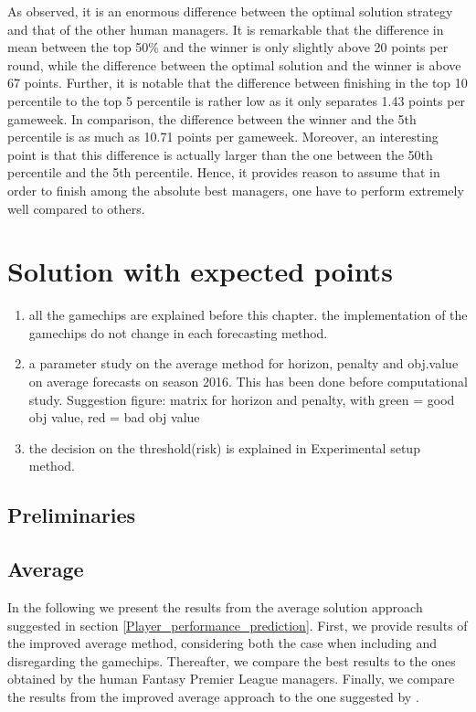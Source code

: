 As observed, it is an enormous difference between the optimal solution strategy and that of the other human managers. It is remarkable that the difference in mean between the top 50\% and the winner is only slightly above 20 points per round, while the difference between the optimal solution and the winner is above 67 points. Further, it is notable that the difference between finishing in the top 10 percentile to the top 5 percentile is rather low as it only separates 1.43 points per gameweek. In comparison, the difference between the winner and the 5th percentile is as much as 10.71 points per gameweek. Moreover, an interesting point is that this difference is actually larger than the one between the 50th percentile and the 5th percentile. Hence, it provides reason to assume that in order to finish among the absolute best managers, one have to perform extremely well compared to others. 
\newpar
 

\section{Solution with expected points}\label{sec:inexact}
\begin{enumerate}
    \item all the gamechips are explained before this chapter. the implementation of the gamechips do not change in each forecasting method. 
    \item a parameter study on the average method for horizon, penalty and obj.value on average forecasts on season 2016. This has been done before computational study. Suggestion figure: matrix for horizon and penalty, with green = good obj value, red = bad obj value
    \item  the decision on the threshold(risk) is explained in Experimental setup method. 
\end{enumerate}

\subsection{Preliminaries}

\subsection{Average} \label{Average_results}
In the following we present the results from the average solution approach suggested in section \ref{Player_performance_prediction}. First, we provide results of the improved average method, considering both the case when including and disregarding the gamechips. Thereafter, we compare the best results to the ones obtained by the human Fantasy Premier League managers. Finally, we compare the results from the improved average approach to the one suggested by \cite{Bonomo}.

